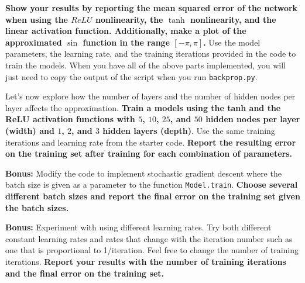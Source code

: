 \documentclass[preview]{standalone}
\begin{document}
\begin{Parts}
\Part \textbf{Show your results by reporting the mean squared error of the network when using the $ReLU$ nonlinearity, the $\tanh$ nonlinearity, and the linear activation function.  Additionally, make a plot of the approximated $\sin$ function in the range $[-\pi,\pi]$.}  Use the model parameters, the learning rate, and the training iterations provided in the code to train the models.  When you have all of the above parts implemented, you will just need to copy the output of the script when you run \texttt{backprop.py}.



\Part Let's now explore how the number of layers and the number of hidden nodes per layer affects the approximation.  \textbf{Train a models using the tanh and the ReLU activation functions with $5$, $10$, $25$, and $50$ hidden nodes per layer (width) and $1$, $2$, and $3$ hidden layers (depth)}.  Use the same training iterations and learning rate from the starter code.  \textbf{Report the resulting error on the training set after training for each combination of parameters.}






\Part \textbf{Bonus:} Modify the code to implement stochastic gradient descent where the batch size is given as a parameter to the function \texttt{Model.train}. \textbf{Choose several different batch sizes and report the final error on the training set given the batch sizes.}



\Part \textbf{Bonus:} Experiment with using different learning rates.  Try both different constant learning rates and rates that change with the iteration number such as one that is proportional to 1/iteration.  Feel free to change the number of training iterations.  \textbf{Report your results with the number of training iterations and the final error on the training set.}



\end{Parts}
\end{document}
